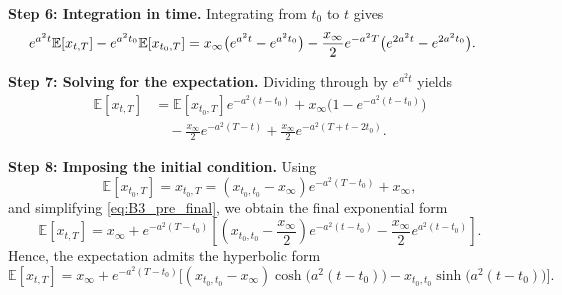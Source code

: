 \documentclass[12pt]{article}
\theoremstyle{statementstyle}
\begin{document}
\begin{appendices}
\medskip
\noindent\textbf{Step 6: Integration in time.}
Integrating from $t_0$ to $t$ gives
\begin{align}
e^{a^{2}t}\mathbb{E}[x_{t,T}]
-
e^{a^{2}t_0}\mathbb{E}[x_{t_0,T}]
&=
x_{\infty}\bigl(e^{a^{2}t}-e^{a^{2}t_0}\bigr)
-
\frac{x_{\infty}}{2}e^{-a^{2}T}
\bigl(e^{2a^{2}t}-e^{2a^{2}t_0}\bigr).
\notag
\end{align}

\medskip
\noindent\textbf{Step 7: Solving for the expectation.}
Dividing through by $e^{a^{2}t}$ yields
\begin{align}
\mathbb{E}[x_{t,T}]
&=
\mathbb{E}[x_{t_0,T}]e^{-a^{2}(t-t_0)}
+
x_{\infty}\bigl(1-e^{-a^{2}(t-t_0)}\bigr)
\nonumber\\
&\quad
-
\frac{x_{\infty}}{2}e^{-a^{2}(T-t)}
+
\frac{x_{\infty}}{2}e^{-a^{2}(T+t-2t_0)}.
\label{eq:B3_pre_final}
\tag{B.3.4}
\end{align}

\medskip
\noindent\textbf{Step 8: Imposing the initial condition.}
Using
\[
\mathbb{E}[x_{t_0,T}] = x_{t_0,T}
=
(x_{t_0,t_0}-x_{\infty})e^{-a^{2}(T-t_0)} + x_{\infty},
\]
and simplifying \eqref{eq:B3_pre_final}, we obtain the final exponential
form
\begin{equation}
\boxed{
\mathbb{E}[x_{t,T}]
=
x_{\infty}
+
e^{-a^{2}(T-t_0)}
\left[
\left(x_{t_0,t_0}-\frac{x_{\infty}}{2}\right)e^{-a^{2}(t-t_0)}
-
\frac{x_{\infty}}{2}e^{a^{2}(t-t_0)}
\right].
}
\label{eq:B3_final_expectation}
\tag{B.3.5}
\end{equation}
Hence, the expectation admits the hyperbolic form
\begin{equation}
\boxed{
\mathbb{E}[x_{t,T}]
=
x_\infty
+
e^{-a^2(T-t_0)}
\Big[
(x_{t_0,t_0}-x_\infty)\cosh\!\big(a^2(t-t_0)\big)
-
x_{t_0,t_0}\sinh\!\big(a^2(t-t_0)\big)
\Big].
}
\tag{B.3.6}
\end{equation}
% 





\end{appendices}
\end{document}
